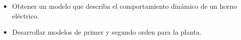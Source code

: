 \begin{itemize}
  \item Obtener un modelo que describa el comportamiento dinámico de un horno eléctrico.
  \item Desarrollar modelos de primer y segundo orden para la planta.
\end{itemize}
